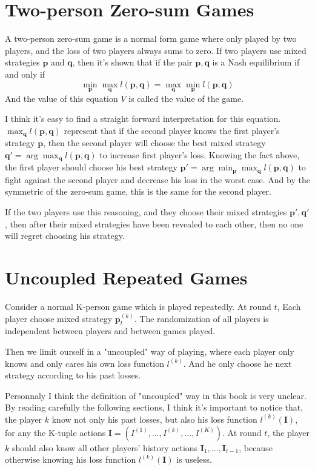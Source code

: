 \documentclass{article} %
\begin{document}
\section{Two-person Zero-sum Games}
A two-person zero-sum game is a normal form game where only played by two players, and the loss of two players always sums to zero. If two players use mixed strategies $\mathbf{p}$ and $\mathbf{q}$, then it's shown that if the pair $\mathbf{p},\mathbf{q}$ is a Nash equilibrium if and only if
$$
\min_{\mathbf{p}} \max_{\mathbf{q}} l(\mathbf{p},\mathbf{q}) = \max_{\mathbf{q}} \min_{\mathbf{p}} l(\mathbf{p},\mathbf{q})
$$
And the value of this equation $V$ is called the value of the game.

I think it's easy to find a straight forward interpretation for this equation. $\max_{\mathbf{q}} l(\mathbf{p},\mathbf{q})$ represent that if the second player knows the first player's strategy $\mathbf{p}$, then the second player will choose the best mixed strategy $\mathbf{q}' = \arg\max_{\mathbf{q}}l(\mathbf{p},\mathbf{q})$ to increase first player's loss. Knowing the fact above, the first player should choose his best strategy $\mathbf{p}' = \arg\min_{\mathbf{p}}\max_{\mathbf{q}}l(\mathbf{p},\mathbf{q})$ to fight against the second player and decrease his loss in the worst case. And by the symmetric of the zero-sum game, this is the same for the second player.

If the two players use this reasoning, and they choose their mixed strategies $\mathbf{p}',\mathbf{q}'$, then after their mixed strategies have been revealed to each other, then no one will regret choosing his strategy.

\section{Uncoupled Repeated Games}
Consider a normal K-person game which is played repeatedly. At round $t$, Each player choose mixed strategy $\mathbf{p}^{(k)}_t$. The randomization of all players is independent between players and between games played.

Then we limit ourself in a "uncoupled" way of playing, where each player only knows and only cares his own loss function $l^{(k)}$. And he only choose he next strategy according to his past losses. 

Personnaly I think the definition of "uncoupled" way in this book is very unclear. By reading carefully the following sections, I think it's important to notice that, the player $k$ know not only his past losses, but also his loss function $l^{(k)}(\mathbf{I})$, for any the K-tuple actions $\mathbf{I}=(I^{(1)},\dots,I^{(k)},\dots,I^{(K)})$. At round $t$, the player $k$ should also know all other players' history actions $\mathbf{I}_1,\dots,\mathbf{I}_{t-1}$, because otherwise knowing his loss function $l^{(k)}(\mathbf{I})$ is useless.
\end{document}
